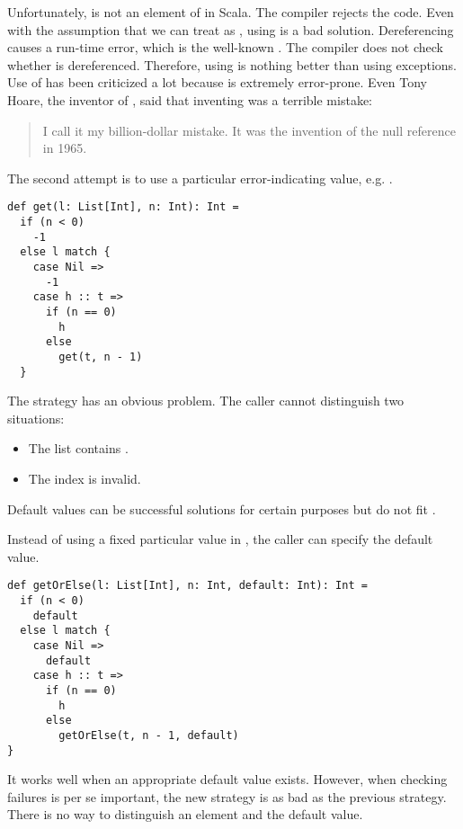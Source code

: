 Unfortunately,  is not an element of  in Scala.
The compiler rejects the code.
Even with the assumption that we can treat  as ,
using  is a bad solution. Dereferencing  causes a
run-time error, which is the well-known .
The compiler does not check whether  is dereferenced.
Therefore, using  is nothing better than using exceptions.
Use of  has been criticized a lot because  is extremely
error-prone. Even Tony Hoare, the inventor of , said that inventing
 was a terrible mistake:

\begin{quote}
I call it my billion-dollar mistake. It was the invention of the null reference
in 1965.
\end{quote}

The second attempt is to use a particular error-indicating value, e.g. .

\begin{verbatim}
def get(l: List[Int], n: Int): Int =
  if (n < 0)
    -1
  else l match {
    case Nil =>
      -1
    case h :: t =>
      if (n == 0)
        h
      else
        get(t, n - 1)
  }
\end{verbatim}

The strategy has an obvious problem. The caller cannot distinguish two
situations:
\begin{itemize}
  \item The list contains .
  \item The index is invalid.
\end{itemize}
Default values can be successful solutions for certain purposes but do not fit .

Instead of using a fixed particular value in , the caller can specify the default value.

\begin{verbatim}
def getOrElse(l: List[Int], n: Int, default: Int): Int =
  if (n < 0)
    default
  else l match {
    case Nil =>
      default
    case h :: t =>
      if (n == 0)
        h
      else
        getOrElse(t, n - 1, default)
}
\end{verbatim}

It works well when an appropriate default value
exists. However, when checking failures is per se important, the new strategy is
as bad as the previous strategy. There is no way to distinguish an element and
the default value.

